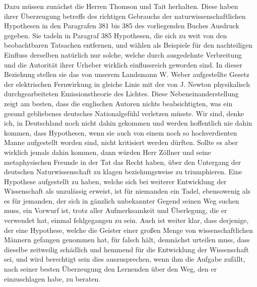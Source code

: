 \documentclass[a4paper, 11pt, oneside, german]{article}
\begin{document}
Dazu müssen zunächst die Herren Thomson und Tait herhalten. Diese haben ihrer Überzeugung betreffs des richtigen Gebrauchs der naturwissenschaftlichen Hypothesen in den Paragrafen 381 bis 385 des vorliegenden Buches Ausdruck gegeben. Sie tadeln in Paragraf 385 Hypothesen, die sich zu weit von den beobachtbaren Tatsachen entfernen, und wählen als Beispiele für den nachteiligen Einfluss derselben natürlich nur solche, welche durch ausgedehnte Verbreitung und die Autorität ihrer Urheber wirklich einflussreich geworden sind. In dieser Beziehung stellen sie das von unserem Landsmann W. Weber aufgestellte Gesetz der elektrischen Fernwirkung in gleiche Linie mit der von J. Newton physikalisch durchgearbeiteten Emissionstheorie des Lichtes. Diese Nebeneinanderstellung zeigt am besten, dass die englischen Autoren nichts beabsichtigten, was ein gesund gebliebenes deutsches Nationalgefühl verletzen müsste. Wir sind, denke ich, in Deutschland noch nicht dahin gekommen und werden hoffentlich nie dahin kommen, dass Hypothesen, wenn sie auch von einem noch so hochverdienten Manne aufgestellt worden sind, nicht kritisiert werden dürften. Sollte es aber wirklich jemals dahin kommen, dann würden Herr Zöllner und seine metaphysischen Freunde in der Tat das Recht haben, über den Untergang der deutschen Naturwissenschaft zu klagen beziehungsweise zu triumphieren. Eine Hypothese aufgestellt zu haben, welche sich bei weiterer Entwicklung der Wissenschaft als unzulässig erweist, ist für niemanden ein Tadel, ebensowenig als es für jemanden, der sich in gänzlich unbekannter Gegend seinen Weg suchen muss, ein Vorwurf ist, trotz aller Aufmerksamkeit und Überlegung, die er verwendet hat, einmal fehlgegangen zu sein. Auch ist weiter klar, dass derjenige, der eine Hypothese, welche die Geister einer großen Menge von wissenschaftlichen Männern gefangen genommen hat, für falsch hält, demnächst urteilen muss, dass dieselbe zeitweilig schädlich und hemmend für die Entwicklung der Wissenschaft sei, und wird berechtigt sein dies auszusprechen, wenn ihm die Aufgabe zufällt, nach seiner besten Überzeugung den Lernenden über den Weg, den er einzuschlagen habe, zu beraten.
\end{document}
